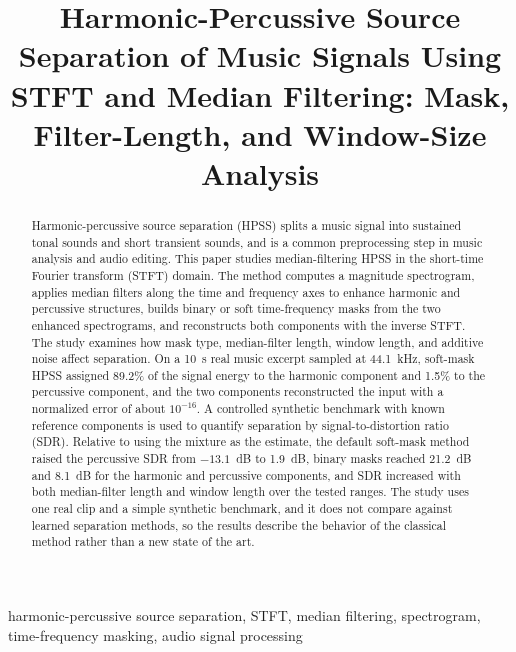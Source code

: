 \documentclass[conference]{IEEEtran}
\begin{document}
\title{Harmonic-Percussive Source Separation of Music Signals Using STFT and Median Filtering: Mask, Filter-Length, and Window-Size Analysis}

\author{
}

\maketitle

\begin{abstract}
Harmonic-percussive source separation (HPSS) splits a music signal into sustained tonal sounds and short transient sounds, and is a common preprocessing step in music analysis and audio editing. This paper studies median-filtering HPSS in the short-time Fourier transform (STFT) domain. The method computes a magnitude spectrogram, applies median filters along the time and frequency axes to enhance harmonic and percussive structures, builds binary or soft time-frequency masks from the two enhanced spectrograms, and reconstructs both components with the inverse STFT. The study examines how mask type, median-filter length, window length, and additive noise affect separation. On a 10~s real music excerpt sampled at 44.1~kHz, soft-mask HPSS assigned 89.2\% of the signal energy to the harmonic component and 1.5\% to the percussive component, and the two components reconstructed the input with a normalized error of about $10^{-16}$. A controlled synthetic benchmark with known reference components is used to quantify separation by signal-to-distortion ratio (SDR). Relative to using the mixture as the estimate, the default soft-mask method raised the percussive SDR from $-13.1$~dB to 1.9~dB, binary masks reached 21.2~dB and 8.1~dB for the harmonic and percussive components, and SDR increased with both median-filter length and window length over the tested ranges. The study uses one real clip and a simple synthetic benchmark, and it does not compare against learned separation methods, so the results describe the behavior of the classical method rather than a new state of the art.
\end{abstract}

\begin{IEEEkeywords}
harmonic-percussive source separation, STFT, median filtering, spectrogram, time-frequency masking, audio signal processing
\end{IEEEkeywords}
\end{document}
